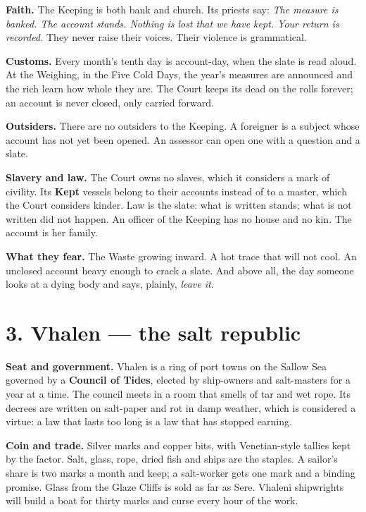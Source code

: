 \documentclass{design/chronicle}
\begin{document}
\textbf{Faith.} The Keeping is both bank and church. Its priests say: \emph{The measure is banked. The account stands. Nothing is lost that we have kept. Your return is recorded.} They never raise their voices. Their violence is grammatical.

\textbf{Customs.} Every month’s tenth day is account-day, when the slate is read aloud. At the Weighing, in the Five Cold Days, the year’s measures are announced and the rich learn how whole they are. The Court keeps its dead on the rolls forever; an account is never closed, only carried forward.

\textbf{Outsiders.} There are no outsiders to the Keeping. A foreigner is a subject whose account has not yet been opened. An assessor can open one with a question and a slate.

\textbf{Slavery and law.} The Court owns no slaves, which it considers a mark of civility. Its \textbf{Kept} vessels belong to their accounts instead of to a master, which the Court considers kinder. Law is the slate: what is written stands; what is not written did not happen. An officer of the Keeping has no house and no kin. The account is her family.

\textbf{What they fear.} The Waste growing inward. A hot trace that will not cool. An unclosed account heavy enough to crack a slate. And above all, the day someone looks at a dying body and says, plainly, \emph{leave it}.

\section*{3. Vhalen — the salt republic}

\textbf{Seat and government.} Vhalen is a ring of port towns on the Sallow Sea governed by a \textbf{Council of Tides}, elected by ship-owners and salt-masters for a year at a time. The council meets in a room that smells of tar and wet rope. Its decrees are written on salt-paper and rot in damp weather, which is considered a virtue: a law that lasts too long is a law that has stopped earning.

\textbf{Coin and trade.} Silver marks and copper bits, with Venetian-style tallies kept by the factor. Salt, glass, rope, dried fish and ships are the staples. A sailor’s share is two marks a month and keep; a salt-worker gets one mark and a binding promise. Glass from the Glaze Cliffs is sold as far as Sere. Vhaleni shipwrights will build a boat for thirty marks and curse every hour of the work.
\end{document}

